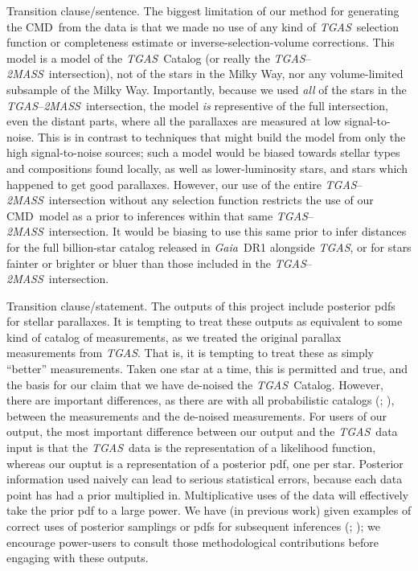 \documentclass[modern]{aastex61}
\newcommand{\acronym}[1]{{\small{#1}}}
\newcommand{\project}[1]{\textsl{#1}}
\newcommand{\tgas}{\project{\acronym{TGAS}}}
\newcommand{\tmass}{\project{\acronym{2MASS}}}
\newcommand{\gaia}{\project{Gaia}}
\newcommand{\cmd}{\acronym{CMD}}
\begin{document}
Transition clause/sentence. The biggest limitation of our method for generating the \cmd\ from the data is that we made no use of any kind of \tgas\ selection
function or completeness estimate or inverse-selection-volume corrections.
This model is a model of the \tgas\ Catalog
(or really the \tgas--\tmass\ intersection), not of the stars in
the Milky Way, nor any volume-limited subsample of the Milky Way.
Importantly, because we used \emph{all} of the stars in the \tgas--\tmass\
intersection, the model \emph{is} representive of the full intersection,
even the distant parts, where all the parallaxes are measured at low
signal-to-noise.
This is in contrast to techniques that might build the model from only
the high signal-to-noise sources; such a model would be biased towards
stellar types and compositions found locally, as well as lower-luminosity stars,
and stars which happened to get good parallaxes.
However, our use of the entire \tgas--\tmass\ intersection without
any selection function restricts the use of our \cmd\ model as a prior
to inferences within that same \tgas--\tmass\ intersection.
It would be biasing to use this same prior to infer
distances for the full billion-star catalog released in \gaia\ DR1
alongside \tgas, or for stars fainter or brighter or bluer than those
included in the \tgas--\tmass\ intersection.

Transition clause/statement. The outputs of this project include posterior pdfs for stellar parallaxes.
It is tempting to treat these outputs as equivalent to some kind of catalog of
measurements, as we treated the original parallax measurements from \tgas.
That is, it is tempting to treat these as simply ``better'' measurements.
Taken one star at a time, this is permitted and true, and the basis for our
claim that we have de-noised the \tgas\ Catalog.
However, there are important differences, as there are with all
probabilistic catalogs (\citealt{hogg11}; \citealt{portillo17}), between the
measurements and the de-noised measurements.
For users of our output, the most important difference between our
output and the \tgas\ data input is that the \tgas\ data is the representation
of a likelihood function, whereas our ouptut is a
representation of a posterior pdf, one per star.
Posterior information used naively can lead to serious statistical
errors, because each data point has had a prior multiplied in.
Multiplicative uses of the data will effectively take the prior
pdf to a large power.
We have (in previous work)
given examples of correct uses of posterior samplings or pdfs
for subsequent inferences (\citealt{hogg08}; \citealt{dfm14}); we
encourage power-users to consult those methodological
contributions before engaging with these outputs.
\end{document}
